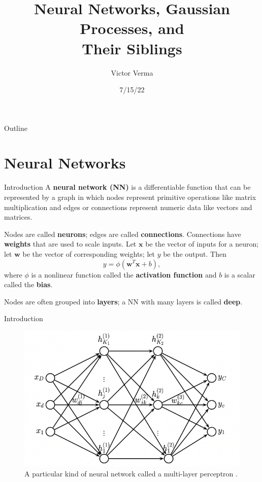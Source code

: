 \documentclass{beamer}
\title[NNs, GPs, and Their Siblings]{
Neural Networks, Gaussian Processes, and \\
Their Siblings
}
\author[Victor Verma]{Victor Verma}
\institute[]{Hot Ideas in Machine Learning Reading Group, University of Michigan}
\date{7/15/22}
\begin{document}
\begin{frame}
  \titlepage
\end{frame}

\begin{frame}{Outline}
    \tableofcontents
\end{frame}

\section{Neural Networks}

\begin{frame}{Introduction}
    A \textbf{neural network (NN)} is a differentiable function that can be represented by a graph in which nodes represent primitive operations like matrix multiplication and edges or connections represent numeric data like vectors and matrices.
    
    \medskip
    
    Nodes are called \textbf{neurons}; edges are called \textbf{connections}. Connections have \textbf{weights} that are used to scale inputs. Let $\boldsymbol{x}$ be the vector of inputs for a neuron; let $\boldsymbol{w}$ be the vector of corresponding weights; let $y$ be the output. Then
    \[
    y = \phi(\boldsymbol{w}^T \boldsymbol{x} + b),
    \]
    where $\phi$ is a nonlinear function called the \textbf{activation function} and $b$ is a scalar called the \textbf{bias}.
    
    \medskip
    
    Nodes are often grouped into \textbf{layers}; a NN with many layers is called \textbf{deep}.
\end{frame}

\begin{frame}{Introduction}
    \begin{figure}
        \centering
        \includegraphics[scale=0.8]{mlp.png}
        \caption{A particular kind of neural network called a multi-layer perceptron \cite{pml2Book}.}
        \label{fig:mlp}
    \end{figure}    
\end{frame}
\end{document}
